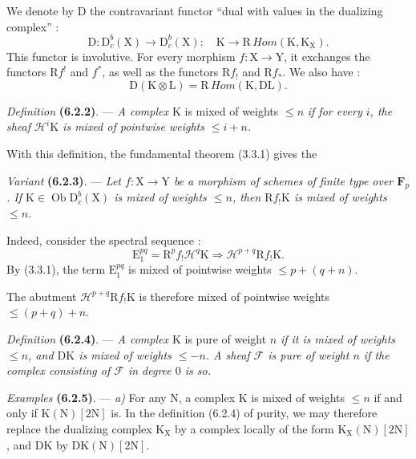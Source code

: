 \documentclass[11pt,leqno]{article}
\begin{document}
We denote by \(\mathrm{D}\) the contravariant functor “dual with values
in the dualizing complex” :
\[
\mathrm{D}:\mathrm{D}_c^b(\mathrm{X})\to\mathrm{D}_c^b(\mathrm{X}):
\quad \mathrm{K}\to\mathrm{R}\,\mathit{Hom}(\mathrm{K},\mathrm{K}_{\mathrm{X}}).
\]
This functor is involutive. For every morphism
\(f:\mathrm{X}\to\mathrm{Y}\), it exchanges the functors
\(\mathrm{R}f^!\) and \(f^*\), as well as the functors
\(\mathrm{R}f_!\) and \(\mathrm{R}f_*\). We also have :
\[
\mathrm{D}(\mathrm{K}\otimes\mathrm{L})
=\mathrm{R}\,\mathit{Hom}(\mathrm{K},\mathrm{D}\mathrm{L}).
\]

\textit{Definition} \textbf{(6.2.2)}. — \textit{A complex
\(\mathrm{K}\)} is mixed of weights \(\leq n\) \textit{if for every
\(i\), the sheaf \(\mathscr{H}^i\mathrm{K}\) is mixed of pointwise
weights \(\leq i+n\).}

With this definition, the fundamental theorem (3.3.1) gives the

\textit{Variant} \textbf{(6.2.3)}. — \textit{Let
\(f:\mathrm{X}\to\mathrm{Y}\) be a morphism of schemes of finite type
over \(\mathbf{F}_p\). If
\(\mathrm{K}\in\operatorname{Ob}\mathrm{D}_c^b(\mathrm{X})\) is
mixed of weights \(\leq n\), then \(\mathrm{R}f_!\mathrm{K}\) is
mixed of weights \(\leq n\).}

Indeed, consider the spectral sequence :
\[
\mathrm{E}_1^{pq}=\mathrm{R}^pf_!\mathscr{H}^q\mathrm{K}
\Rightarrow\mathscr{H}^{p+q}\mathrm{R}f_!\mathrm{K}.
\]
By (3.3.1), the term \(\mathrm{E}_1^{pq}\) is mixed of pointwise
weights \(\leq p+(q+n)\).

The abutment \(\mathscr{H}^{p+q}\mathrm{R}f_!\mathrm{K}\) is
therefore mixed of pointwise weights \(\leq(p+q)+n\).

\textit{Definition} \textbf{(6.2.4)}. — \textit{A complex
\(\mathrm{K}\)} is pure of weight \(n\) \textit{if it is mixed of
weights \(\leq n\), and \(\mathrm{D}\mathrm{K}\) is mixed of
weights \(\leq-n\). A sheaf \(\mathscr{F}\) is pure of weight
\(n\) if the complex consisting of \(\mathscr{F}\) in degree \(0\) is so.}

\textit{Examples} \textbf{(6.2.5)}. — \textit{a)} For any
\(\mathrm{N}\), a complex \(\mathrm{K}\) is mixed of weights
\(\leq n\) if and only if \(\mathrm{K}(\mathrm{N})[2\mathrm{N}]\)
is. In the definition (6.2.4) of purity, we may therefore replace
the dualizing complex \(\mathrm{K}_{\mathrm{X}}\) by a complex
locally of the form \(\mathrm{K}_{\mathrm{X}}(\mathrm{N})[2\mathrm{N}]\),
and \(\mathrm{D}\mathrm{K}\) by
\(\mathrm{D}\mathrm{K}(\mathrm{N})[2\mathrm{N}]\).
\end{document}
